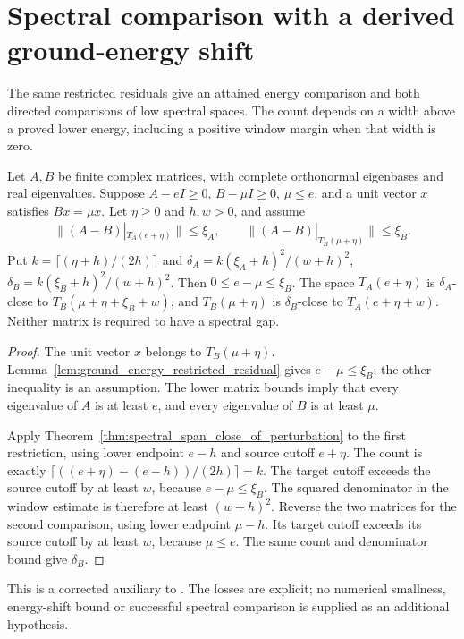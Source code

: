 \section{Spectral comparison with a derived ground-energy shift}
\label{sec:ground_shift_comparison}

The same restricted residuals give an attained energy comparison and
both directed comparisons of low spectral spaces. The count depends
on a width above a proved lower energy, including a positive window
margin when that width is zero.

\begin{lemma}
    \label{lem:ground_shift_spectral_pair}
    \leanok
    Let $A,B$ be finite complex matrices, with complete orthonormal
    eigenbases and real eigenvalues. Suppose
    $A-eI\geq0$, $B-\mu I\geq0$, $\mu\leq e$, and a unit vector
    $x$ satisfies $Bx=\mu x$. Let $\eta\geq0$ and $h,w>0$, and assume
    \begin{align}
        \|(A-B)|_{T_A(e+\eta)}\|\leq\xi_A,\qquad
        \|(A-B)|_{T_B(\mu+\eta)}\|\leq\xi_B.
    \end{align}
    Put $k=\lceil(\eta+h)/(2h)\rceil$ and
    $\delta_A=k(\xi_A+h)^2/(w+h)^2$,
    $\delta_B=k(\xi_B+h)^2/(w+h)^2$.
    Then $0\leq e-\mu\leq\xi_B$. The space
    $T_A(e+\eta)$ is $\delta_A$-close to
    $T_B(\mu+\eta+\xi_B+w)$, and $T_B(\mu+\eta)$ is
    $\delta_B$-close to $T_A(e+\eta+w)$.
    Neither matrix is required to have a spectral gap.
\end{lemma}
\begin{proof}\leanok
    The unit vector $x$ belongs to $T_B(\mu+\eta)$.
    Lemma~\ref{lem:ground_energy_restricted_residual} gives
    $e-\mu\leq\xi_B$; the other inequality is an assumption.
    The lower matrix bounds imply that every eigenvalue of $A$ is
    at least $e$, and every eigenvalue of $B$ is at least $\mu$.

    Apply Theorem~\ref{thm:spectral_span_close_of_perturbation} to
    the first restriction, using lower endpoint $e-h$ and source
    cutoff $e+\eta$. The count is exactly
    $\lceil((e+\eta)-(e-h))/(2h)\rceil=k$.
    The target cutoff exceeds the source cutoff by at least $w$,
    because $e-\mu\leq\xi_B$. The squared denominator in the
    window estimate is therefore at least $(w+h)^2$.
    Reverse the two matrices for the second comparison, using lower
    endpoint $\mu-h$. Its target cutoff exceeds its source cutoff
    by at least $w$, because $\mu\leq e$.
    The same count and denominator bound give $\delta_B$.
\end{proof}

This is a corrected auxiliary to
\cite[lines 1195--1255 and 1373--1392]{Arad2016RigorousRG}.
The losses are explicit; no numerical smallness, energy-shift bound or
successful spectral comparison is supplied as an additional hypothesis.
